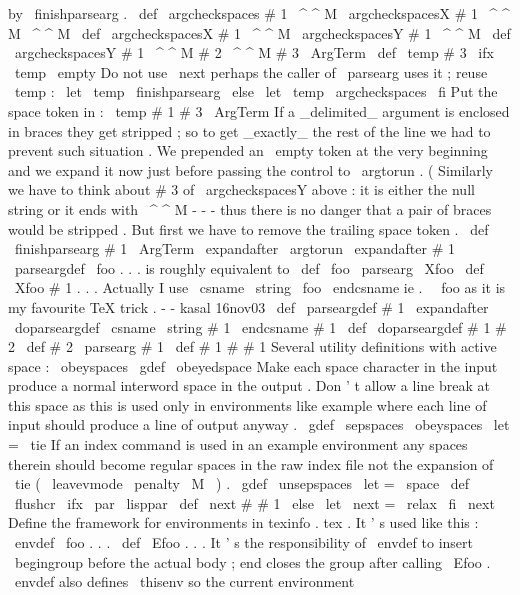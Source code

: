 {%
by
\
finishparsearg
.
%
\
def
\
argcheckspaces
#
1
\
^
^
M
{
\
argcheckspacesX
#
1
\
^
^
M
\
^
^
M
}
\
def
\
argcheckspacesX
#
1
\
^
^
M
{
\
argcheckspacesY
#
1
\
^
^
M
}
\
def
\
argcheckspacesY
#
1
\
^
^
M
#
2
\
^
^
M
#
3
\
ArgTerm
{
%
\
def
\
temp
{
#
3
}
%
\
ifx
\
temp
\
empty
%
Do
not
use
\
next
perhaps
the
caller
of
\
parsearg
uses
it
;
reuse
\
temp
:
\
let
\
temp
\
finishparsearg
\
else
\
let
\
temp
\
argcheckspaces
\
fi
%
Put
the
space
token
in
:
\
temp
#
1
#
3
\
ArgTerm
}
%
If
a
_delimited_
argument
is
enclosed
in
braces
they
get
stripped
;
so
%
to
get
_exactly_
the
rest
of
the
line
we
had
to
prevent
such
situation
.
%
We
prepended
an
\
empty
token
at
the
very
beginning
and
we
expand
it
now
%
just
before
passing
the
control
to
\
argtorun
.
%
(
Similarly
we
have
to
think
about
#
3
of
\
argcheckspacesY
above
:
it
is
%
either
the
null
string
or
it
ends
with
\
^
^
M
-
-
-
thus
there
is
no
danger
%
that
a
pair
of
braces
would
be
stripped
.
%
%
But
first
we
have
to
remove
the
trailing
space
token
.
%
\
def
\
finishparsearg
#
1
\
ArgTerm
{
\
expandafter
\
argtorun
\
expandafter
{
#
1
}
}
%
\
parseargdef
\
foo
{
.
.
.
}
%
is
roughly
equivalent
to
%
\
def
\
foo
{
\
parsearg
\
Xfoo
}
%
\
def
\
Xfoo
#
1
{
.
.
.
}
%
%
Actually
I
use
\
csname
\
string
\
foo
\
endcsname
ie
.
\
\
foo
as
it
is
my
%
favourite
TeX
trick
.
-
-
kasal
16nov03
\
def
\
parseargdef
#
1
{
%
\
expandafter
\
doparseargdef
\
csname
\
string
#
1
\
endcsname
#
1
%
}
\
def
\
doparseargdef
#
1
#
2
{
%
\
def
#
2
{
\
parsearg
#
1
}
%
\
def
#
1
#
#
1
%
}
%
Several
utility
definitions
with
active
space
:
{
\
obeyspaces
\
gdef
\
obeyedspace
{
}
%
Make
each
space
character
in
the
input
produce
a
normal
interword
%
space
in
the
output
.
Don
'
t
allow
a
line
break
at
this
space
as
this
%
is
used
only
in
environments
like
example
where
each
line
of
input
%
should
produce
a
line
of
output
anyway
.
%
\
gdef
\
sepspaces
{
\
obeyspaces
\
let
=
\
tie
}
%
If
an
index
command
is
used
in
an
example
environment
any
spaces
%
therein
should
become
regular
spaces
in
the
raw
index
file
not
the
%
expansion
of
\
tie
(
\
leavevmode
\
penalty
\
M
\
)
.
\
gdef
\
unsepspaces
{
\
let
=
\
space
}
}
\
def
\
flushcr
{
\
ifx
\
par
\
lisppar
\
def
\
next
#
#
1
{
}
\
else
\
let
\
next
=
\
relax
\
fi
\
next
}
%
Define
the
framework
for
environments
in
texinfo
.
tex
.
It
'
s
used
like
this
:
%
%
\
envdef
\
foo
{
.
.
.
}
%
\
def
\
Efoo
{
.
.
.
}
%
%
It
'
s
the
responsibility
of
\
envdef
to
insert
\
begingroup
before
the
%
actual
body
;
end
closes
the
group
after
calling
\
Efoo
.
\
envdef
also
%
defines
\
thisenv
so
the
current
environment
}
